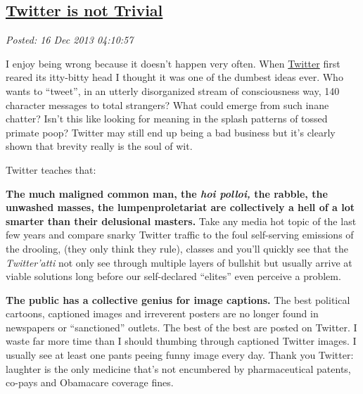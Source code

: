 %

\subsection*{\href{http://bakerjd99.wordpress.com/2013/12/15/twitter-is-not-trivial/}{Twitter is not Trivial}}


\noindent\emph{Posted: 16 Dec 2013 04:10:57}
\vspace{6pt}

I enjoy being wrong because it doesn't happen very often. When
\href{https://twitter.com/}{Twitter} first reared its itty-bitty head I
thought it was one of the dumbest ideas ever. Who wants to ``tweet'', in
an utterly disorganized stream of consciousness way, 140 character
messages to total strangers? What could emerge from such inane chatter?
Isn't this like looking for meaning in the splash patterns of tossed
primate poop? Twitter may still end up being a bad business but it's
clearly shown that brevity really is the soul of wit.

\medskip 

Twitter teaches that:

\medskip

\textbf{The much maligned common man, the \emph{hoi polloi,} the rabble,
the unwashed masses, the lumpenproletariat are collectively a hell of a
lot smarter than their delusional masters.} Take any media hot topic of
the last few years and compare snarky Twitter traffic to the foul
self-serving emissions of the drooling, (they only think they rule),
classes and you'll quickly see that the \emph{Twitter'atti} not only see
through multiple layers of bullshit but usually arrive at viable
solutions long before our self-declared ``elites'' even perceive a
problem.

\textbf{The public has a collective genius for image captions.} The best
political cartoons, captioned images and irreverent posters are no
longer found in newspapers or ``sanctioned'' outlets. The best of the
best are posted on Twitter. I waste far more time than I should thumbing
through captioned Twitter images. I usually see at least one pants
peeing funny image every day. Thank you Twitter: laughter is the only
medicine that's not encumbered by pharmaceutical patents, co-pays and
Obamacare coverage fines.



